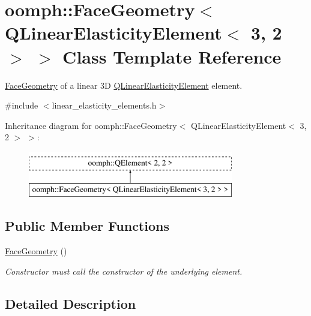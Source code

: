 \hypertarget{classoomph_1_1FaceGeometry_3_01QLinearElasticityElement_3_013_00_012_01_4_01_4}{}\section{oomph\+:\+:Face\+Geometry$<$ Q\+Linear\+Elasticity\+Element$<$ 3, 2 $>$ $>$ Class Template Reference}
\label{classoomph_1_1FaceGeometry_3_01QLinearElasticityElement_3_013_00_012_01_4_01_4}


\hyperlink{classoomph_1_1FaceGeometry}{Face\+Geometry} of a linear 3D \hyperlink{classoomph_1_1QLinearElasticityElement}{Q\+Linear\+Elasticity\+Element} element.  




{\ttfamily \#include $<$linear\+\_\+elasticity\+\_\+elements.\+h$>$}

Inheritance diagram for oomph\+:\+:Face\+Geometry$<$ Q\+Linear\+Elasticity\+Element$<$ 3, 2 $>$ $>$\+:\begin{figure}[H]
\begin{center}
\leavevmode
\includegraphics[height=2.000000cm]{classoomph_1_1FaceGeometry_3_01QLinearElasticityElement_3_013_00_012_01_4_01_4}
\end{center}
\end{figure}
\subsection*{Public Member Functions}
\begin{DoxyCompactItemize}
\item 
\hyperlink{classoomph_1_1FaceGeometry_3_01QLinearElasticityElement_3_013_00_012_01_4_01_4_a0b4f8dfe4ce2b194545b195086c55b7b}{Face\+Geometry} ()
\begin{DoxyCompactList}\small\item\em Constructor must call the constructor of the underlying element. \end{DoxyCompactList}\end{DoxyCompactItemize}


\subsection{Detailed Description}
